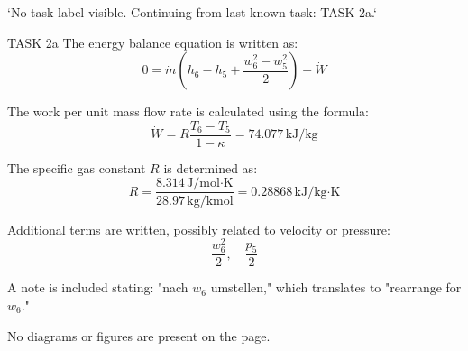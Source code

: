 `No task label visible. Continuing from last known task: TASK 2a.`

TASK 2a  
The energy balance equation is written as:  
\[
0 = \dot{m} \left( h_6 - h_5 + \frac{w_6^2 - w_5^2}{2} \right) + \dot{W}
\]  

The work per unit mass flow rate is calculated using the formula:  
\[
\dot{W} = R \frac{T_6 - T_5}{1 - \kappa} = 74.077 \, \text{kJ/kg}
\]  

The specific gas constant \( R \) is determined as:  
\[
R = \frac{8.314 \, \text{J/mol·K}}{28.97 \, \text{kg/kmol}} = 0.28868 \, \text{kJ/kg·K}
\]  

Additional terms are written, possibly related to velocity or pressure:  
\[
\frac{w_6^2}{2}, \quad \frac{p_5}{2}
\]  

A note is included stating:  
"nach \( w_6 \) umstellen,"  
which translates to "rearrange for \( w_6 \)."  

No diagrams or figures are present on the page.